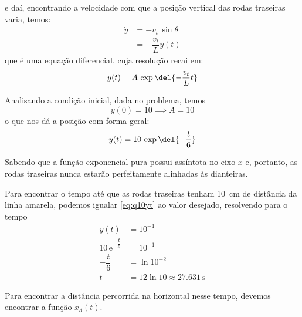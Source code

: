 \documentclass[]{IMTexam}
\begin{document}
\begin{questions}
\begin{solution}
\begin{multi}
		\end{multi}

		e daí, encontrando a velocidade com que a posição vertical das rodas traseiras varia, temos:
		\begin{align*}
			\dot{y} & =-v_t\,\sin\theta    \\
			        & =-\dfrac{v_t}{L}y(t)
		\end{align*}
		que é uma equação diferencial, cuja resolução recai em:
		\[ y(t)=A\,\exp{\del{-\dfrac{v_t}{L}t}} \]

		Analisando a condição inicial, dada no problema, temos
		\[ y(0)=10\implies A=10 \]
		o que nos dá a posição com forma geral:
		\begin{equation}\label{eq:q10yt}
			y(t)=10\,\exp{\del{-\dfrac{t}{6}}}
		\end{equation}

		Sabendo que a função exponencial pura possui assíntota no eixo $ x $ e, portanto, as rodas traseiras nunca estarão perfeitamente alinhadas às dianteiras.

		Para encontrar o tempo até que as rodas traseiras tenham \SI{10}{\centi\meter} de distância da linha amarela, podemos igualar \ref{eq:q10yt} ao valor desejado, resolvendo para o tempo
		\begin{align*}
			y(t)                           & =10^{-1}                            \\
			10\,\mathrm{e}^{-\dfrac{t}{6}} & =10^{-1}                            \\
			-\dfrac{t}{6}                  & =\ln 10^{-2}                        \\
			t                              & =12\ln10\approx\SI{27.631}{\second}
		\end{align*}

		Para encontrar a distância percorrida na horizontal nesse tempo, devemos encontrar a função $ x_d(t) $.


\end{solution}
\end{questions}
\end{document}
